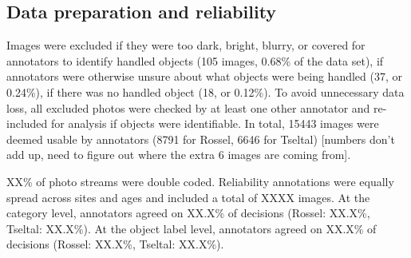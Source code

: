 \documentclass[10pt, letterpaper]{article}
\begin{document}
\hypertarget{data-preparation-and-reliability}{%
\subsection{Data preparation and
reliability}\label{data-preparation-and-reliability}}

Images were excluded if they were too dark, bright, blurry, or covered
for annotators to identify handled objects (105 images, 0.68\% of the
data set), if annotators were otherwise unsure about what objects were
being handled (37, or 0.24\%), if there was no handled object (18, or
0.12\%). To avoid unnecessary data loss, all excluded photos were
checked by at least one other annotator and re-included for analysis if
objects were identifiable. In total, 15443 images were deemed usable by
annotators (8791 for Rossel, 6646 for Tseltal) {[}numbers don't add up,
need to figure out where the extra 6 images are coming from{]}.

XX\% of photo streams were double coded. Reliability annotations were
equally spread across sites and ages and included a total of XXXX
images. At the category level, annotators agreed on XX.X\% of decisions
(Rossel: XX.X\%, Tseltal: XX.X\%). At the object label level, annotators
agreed on XX.X\% of decisions (Rossel: XX.X\%, Tseltal: XX.X\%).

\begin{table}[!ht]
\centering
{}
\caption{Non-study-related objects handled by the most children across categories and sites.} 
\label{tab:top-objects}
\end{table}
\end{document}
